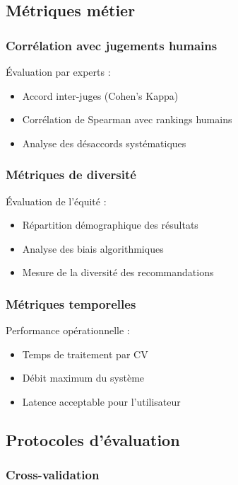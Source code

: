 \documentclass[12pt,a4paper]{report}
\begin{document}
\subsection{Métriques métier}

\subsubsection{Corrélation avec jugements humains}

Évaluation par experts :
\begin{itemize}
\item Accord inter-juges (Cohen's Kappa)
\item Corrélation de Spearman avec rankings humains
\item Analyse des désaccords systématiques
\end{itemize}

\subsubsection{Métriques de diversité}

Évaluation de l'équité :
\begin{itemize}
\item Répartition démographique des résultats
\item Analyse des biais algorithmiques
\item Mesure de la diversité des recommandations
\end{itemize}

\subsubsection{Métriques temporelles}

Performance opérationnelle :
\begin{itemize}
\item Temps de traitement par CV
\item Débit maximum du système
\item Latence acceptable pour l'utilisateur
\end{itemize}

\subsection{Protocoles d'évaluation}

\subsubsection{Cross-validation}
\end{document}
